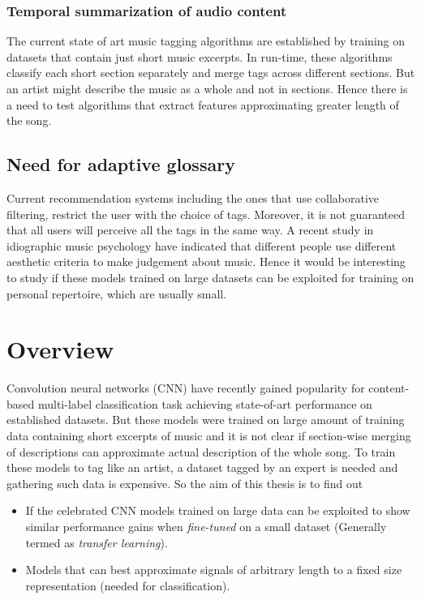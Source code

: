 \subsubsection{Temporal summarization of audio content}
The current state of art music tagging algorithms\cite{choi_crnn}\cite{MultiScale} are established by training on datasets that contain just short music excerpts. In run-time, these algorithms classify each short section separately and merge tags across different sections. But an artist might describe the music as a whole and not in sections. Hence there is a need to test algorithms that extract features approximating greater length of the song. 

\subsection{Need for adaptive glossary}
Current recommendation systems including the ones that use collaborative filtering, restrict the user with the choice of tags. Moreover, it is not guaranteed that all users will perceive all the tags in the same way. A recent study in idiographic music psychology have indicated that different people use different aesthetic criteria to make judgement about music\cite{NoAccountingForTaste}. Hence it would be interesting to study if these models \cite{choi_cnn}\cite{choi_crnn} trained on large datasets can be exploited for training on personal repertoire, which are usually small.  


\section{Overview}
\label{overview}
Convolution neural networks (CNN) have recently gained popularity for content-based multi-label classification task achieving state-of-art performance on established datasets\cite{choi_cnn}\cite{choi_rnn}. But these models were trained on large amount of training data containing short excerpts of music and it is not clear if section-wise merging of descriptions can approximate actual description of the whole song. To train these models to tag like an artist, a dataset tagged by an expert is needed and gathering such data is expensive. So the aim of this thesis is to find out
\begin{itemize}
\setlength\itemsep{0em}
\item If the celebrated CNN models trained on large data can be exploited to show similar performance gains when \textit{fine-tuned} on a small dataset (Generally termed as \textit{transfer learning}).
\item Models that can best approximate signals of arbitrary length to a fixed size representation (needed for classification).
\end{itemize} 
    
